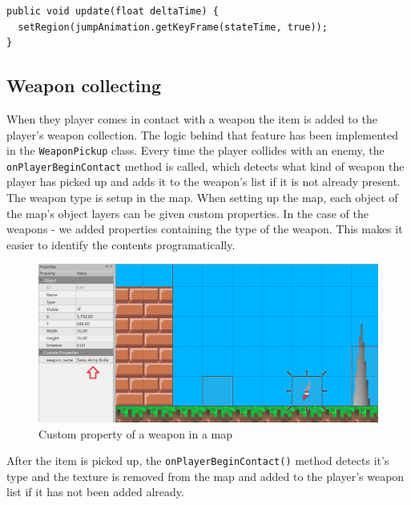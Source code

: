 \documentclass[12p]{article}
\begin{document}
\begin{verbatim}
public void update(float deltaTime) {
  setRegion(jumpAnimation.getKeyFrame(stateTime, true));
}
\end{verbatim}


\newpage
\subsection{Weapon collecting} \label{DocWeaponCollection}

When they player comes in contact with a weapon the item is added to the player's weapon collection. The logic behind that feature has been implemented in the \texttt{WeaponPickup} class. Every time the player collides with an enemy, the \texttt{onPlayerBeginContact} method is called, which detects what kind of weapon the player has picked up and adds it to the weapon's list if it is not already present. The weapon type is setup in the map. When setting up the map, each object of the map's object layers can be given custom properties. In the case of the weapons - we added properties containing the type of the weapon. This makes it easier to identify the contents programatically.

\begin{figure}[ht]
  \center
  \includegraphics[width=1\textwidth]{Documentation/weaponMaps.png}
  \caption{Custom property of a weapon in a map}
\end{figure}

After the item is picked up, the \texttt{onPlayerBeginContact()} method detects it's type and the texture is removed from the map and added to the player's weapon list if it has not been added already.
\end{document}
